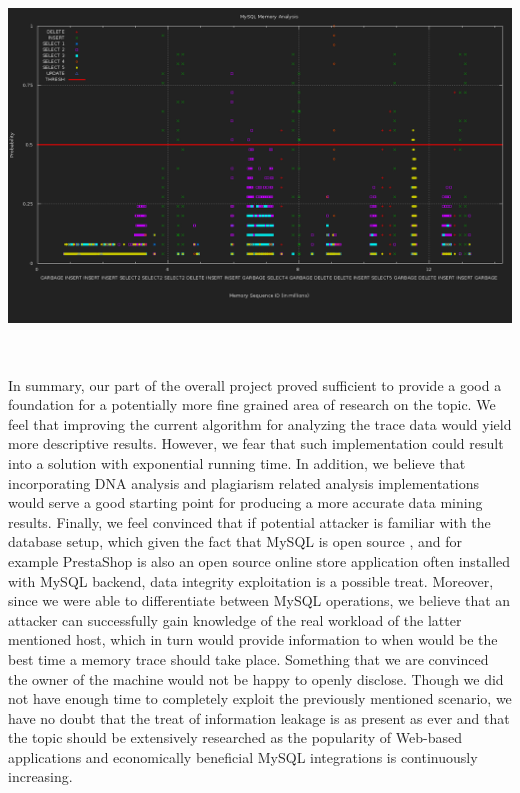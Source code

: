 \documentclass[11pt, oneside]{article}
\begin{document}
\includegraphics[height=4in, width=6.5in]{MySQLAnal.png}

In summary, our part of the overall project proved sufficient to provide a 
good a foundation for a potentially more fine grained area of research on the 
topic. We feel that improving the current algorithm for analyzing the trace 
data would yield more descriptive results. However, we fear that such 
implementation could result into a solution with exponential running time. In 
addition, we believe that incorporating DNA analysis and plagiarism related 
analysis implementations would serve a good starting point for producing a 
more accurate data mining results. Finally, we feel convinced that if 
potential attacker is familiar with the database setup, which given the fact 
that MySQL is open source , and for example PrestaShop is also an open source 
online store application often installed with MySQL backend, data integrity 
exploitation is a possible treat. Moreover, since we were able to 
differentiate between MySQL operations, we believe that an attacker can 
successfully gain knowledge of the real workload of the latter mentioned host, 
which in turn would provide information to when would be the best time a 
memory trace should take place. Something that we are convinced the owner of 
the machine would not be happy to openly disclose. Though we did not have 
enough time to completely exploit the previously mentioned scenario, we have 
no doubt that the treat of information leakage is as present as ever and that 
the topic should be extensively researched as the popularity of Web-based 
applications and economically beneficial MySQL integrations is continuously 
increasing.
\end{document}
